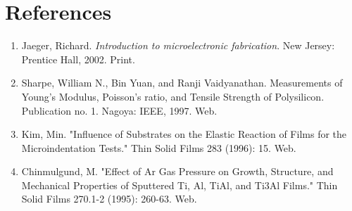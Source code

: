 \documentclass{article}
\begin{document}
\section{References}
\begin{enumerate}
\item Jaeger, Richard. \textit{Introduction to microelectronic fabrication}. New Jersey: Prentice Hall, 2002. Print.
\item Sharpe, William N., Bin Yuan, and Ranji Vaidyanathan. Measurements of Young's Modulus, Poisson's ratio, and Tensile Strength of Polysilicon. Publication no. 1. Nagoya: IEEE, 1997. Web.
\item Kim, Min. "Influence of Substrates on the Elastic Reaction of Films for the Microindentation Tests." Thin Solid Films 283 (1996): 15. Web.
\item Chinmulgund, M. "Effect of Ar Gas Pressure on Growth, Structure, and Mechanical Properties of Sputtered Ti, Al, TiAl, and Ti3Al Films." Thin Solid Films 270.1-2 (1995): 260-63. Web.
\end{enumerate}








\end{document}
